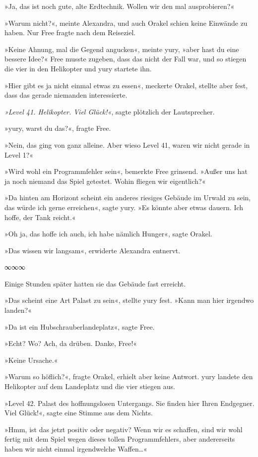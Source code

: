 »Ja, das ist noch gute, alte Erdtechnik. Wollen wir den mal ausprobieren?«

»Warum nicht?«, meinte Alexandra, und auch Orakel schien keine Einwände zu haben. Nur Free fragte nach dem Reiseziel.

»Keine Ahnung, mal die Gegend angucken«, meinte yury, »aber hast du eine bessere Idee?« Free musste zugeben, dass das nicht der Fall war, und so stiegen die vier in den Helikopter und yury startete ihn.

»Hier gibt es ja nicht einmal etwas zu essen«, meckerte Orakel, stellte aber fest, dass das gerade niemanden interessierte.

\textit{»Level 41. Helikopter. Viel Glück!«}, sagte plötzlich der Lautsprecher.

»yury, warst du das?«, fragte Free.

»Nein, das ging von ganz alleine. Aber wieso Level 41, waren wir nicht gerade in Level 1?«

»Wird wohl ein Programmfehler sein«, bemerkte Free grinsend. »Außer uns hat ja noch niemand das Spiel getestet. Wohin fliegen wir eigentlich?«

»Da hinten am Horizont scheint ein anderes riesiges Gebäude im Urwald zu sein, das würde ich gerne erreichen«, sagte yury. »Es könnte aber etwas dauern. Ich hoffe, der Tank reicht.«

»Oh ja, das hoffe ich auch, ich habe nämlich Hunger«, sagte Orakel.

»Das wissen wir langsam«, erwiderte Alexandra entnervt.

\begin{center}
    ∞∞∞
\end{center}

Einige Stunden später hatten sie das Gebäude fast erreicht.

»Das scheint eine Art Palast zu sein«, stellte yury fest. »Kann man hier irgendwo landen?«

»Da ist ein Hubschrauberlandeplatz«, sagte Free.

»Echt? Wo? Ach, da drüben. Danke, Free!«

»Keine Ursache.«

»Warum so höflich?«, fragte Orakel, erhielt aber keine Antwort. yury landete den Helikopter auf dem Landeplatz und die vier stiegen aus.

»Level 42. Palast des hoffnungslosen Untergangs. Sie finden hier Ihren Endgegner. Viel Glück!«, sagte eine Stimme aus dem Nichts.

»Hmm, ist das jetzt positiv oder negativ? Wenn wir es schaffen, sind wir wohl fertig mit dem Spiel wegen dieses tollen Programmfehlers, aber andererseits haben wir nicht einmal irgendwelche Waffen…«

